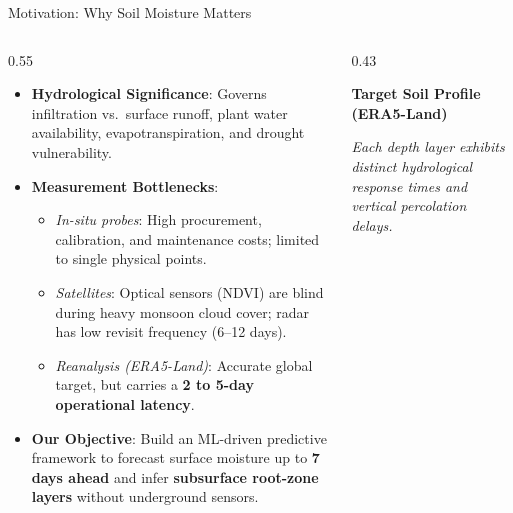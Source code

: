 \documentclass[aspectratio=169, 10pt]{beamer}
\begin{document}
\begin{frame}{Motivation: Why Soil Moisture Matters}
    \begin{columns}
        \begin{column}{0.55\textwidth}
            \begin{itemize}
                \item \textbf{Hydrological Significance}: Governs infiltration vs.\ surface runoff, plant water availability, evapotranspiration, and drought vulnerability.
                \item \textbf{Measurement Bottlenecks}:
                \begin{itemize}
                    \item \textit{In-situ probes}: High procurement, calibration, and maintenance costs; limited to single physical points.
                    \item \textit{Satellites}: Optical sensors (NDVI) are blind during heavy monsoon cloud cover; radar has low revisit frequency (6--12 days).
                    \item \textit{Reanalysis (ERA5-Land)}: Accurate global target, but carries a \textbf{2 to 5-day operational latency}.
                \end{itemize}
                \item \textbf{Our Objective}: Build an ML-driven predictive framework to forecast surface moisture up to \textbf{7 days ahead} and infer \textbf{subsurface root-zone layers} without underground sensors.
            \end{itemize}
        \end{column}
        \begin{column}{0.43\textwidth}
            \begin{exampleblock}{\textbf{Target Soil Profile (ERA5-Land)}}
                \centering
                \vspace{0.1cm}
                \vspace{0.1cm}
                \footnotesize
                \textit{Each depth layer exhibits distinct hydrological response times and vertical percolation delays.}
            \end{exampleblock}
        \end{column}
    \end{columns}
\end{frame}
\end{document}
